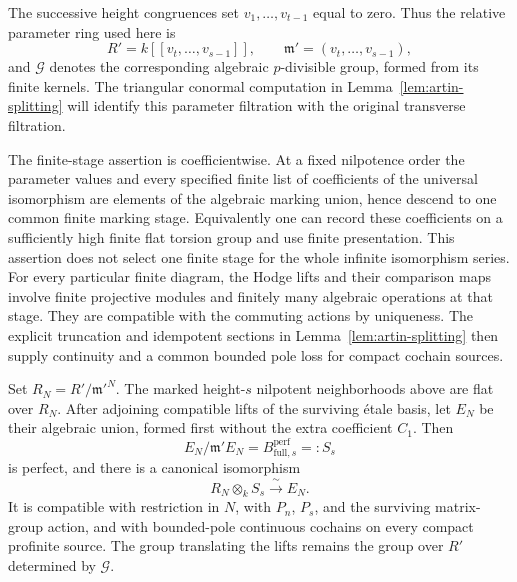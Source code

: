 The successive height congruences set $v_1,\ldots,v_{t-1}$ equal
to zero.  Thus the relative parameter ring used here is
\begin{equation}
 \label{eq:boundary-relative-base}
 R'=k[[v_t,\ldots,v_{s-1}]],
 \qquad \mathfrak m'=(v_t,\ldots,v_{s-1}),
\end{equation}
and $\mathcal G$ denotes the corresponding algebraic
$p$-divisible group, formed from its finite kernels.  The
triangular conormal computation in
Lemma~\ref{lem:artin-splitting} will identify this parameter
filtration with the original transverse filtration.

The finite-stage assertion is coefficientwise.  At a fixed
nilpotence order the parameter values and every specified finite
list of coefficients of the universal isomorphism are elements
of the algebraic marking union, hence descend to one common
finite marking stage.  Equivalently one can record these
coefficients on a sufficiently high finite flat torsion group
and use finite presentation.  This assertion does not select
one finite stage for the whole infinite isomorphism series.
For every particular finite diagram, the Hodge lifts and their
comparison maps involve finite projective modules and finitely
many algebraic operations at that stage.  They are compatible
with the commuting actions by uniqueness.  The explicit
truncation and idempotent sections in
Lemma~\ref{lem:artin-splitting} then supply continuity and a
common bounded pole loss for compact cochain sources.

\begin{lemma}
\label{lem:artin-splitting}
Set $R_N=R'/\mathfrak m'^{N}$.  The marked height-$s$ nilpotent
neighborhoods above are flat over $R_N$.  After adjoining compatible
lifts of the surviving \'etale basis, let $E_N$ be their algebraic
union, formed first without the extra coefficient $C_1$.  Then
\[
 E_N/\mathfrak m'E_N=B_{\mathrm{full},s}^{\mathrm{perf}}=:S_s
\]
is perfect, and there is a canonical isomorphism
\begin{equation}
 \label{eq:boundary-artin-product}
 R_N\otimes_k S_s \xrightarrow{\ \sim\ } E_N.
\end{equation}
It is compatible with restriction in $N$, with $P_n$, $P_s$, and the
surviving matrix-group action, and with bounded-pole continuous
cochains on every compact profinite source.  The group translating
the lifts remains the group over $R'$ determined by $\mathcal G$.
\end{lemma}

